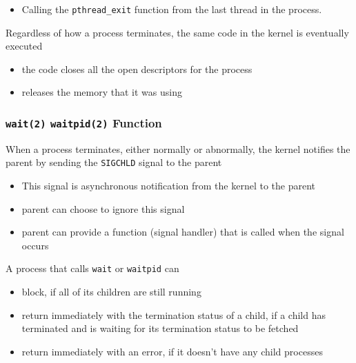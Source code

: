 \documentclass[newPxFont,sthlmFooter,nooffset]{beamer}
\begin{document}
\begin{frame}[t]
\begin{itemize}
  \item Calling the \texttt{pthread\_exit} function from the last
    thread in the process. 
  \end{itemize}

Regardless of how a process terminates, the same code in the kernel is eventually executed
\begin{itemize}
\item the code closes all the open descriptors for the process
\item releases the memory that it was using
\end{itemize}
\end{frame}



\begin{frame}[t]
  \frametitle{\texttt{wait(2)} \texttt{waitpid(2)} Function}
When a process terminates, either normally or abnormally, the kernel notifies the parent by sending the \texttt{SIGCHLD} signal to the parent
\begin{itemize}
\item This signal is asynchronous notification from the kernel to the parent
\item parent can choose to ignore this signal
\item parent can provide a function (signal handler) that is called when the signal occurs
\end{itemize}

A process that calls \texttt{wait} or \texttt{waitpid} can
\begin{itemize}
\item block, if all of its children are still running
\item return immediately with the termination status of a child, if a child has terminated and is waiting for its termination status to be fetched
\item return immediately with an error, if it doesn't have any child processes
\end{itemize}
\end{frame}
\end{document}

